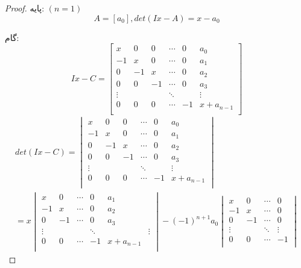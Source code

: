 \begin{proof}
  پایه: $\left(n=1\right)$
  $$ A = [a_0], det(Ix - A) = x - a_0 $$

  گام:
  \begin{equation}
    Ix - C =
    \begin{bmatrix}
      x & 0 & 0 & \cdots & 0 & a_0 \\
      -1 & x & 0 & \cdots & 0 & a_1 \\
      0 & -1 & x & \cdots & 0 & a_2 \\
      0 & 0 & -1 & \cdots & 0 & a_3 \\
      \vdots &  &  & \ddots & & \vdots \\
      0 & 0 & 0 & \cdots & -1 & x + a_{n-1} \\
    \end{bmatrix}
  \end{equation}
  \begin{equation}
    \begin{split}
      det(Ix - C) =
      \begin{vmatrix}
        x & 0 & 0 & \cdots & 0 & a_0 \\
        -1 & x & 0 & \cdots & 0 & a_1 \\
        0 & -1 & x & \cdots & 0 & a_2 \\
        0 & 0 & -1 & \cdots & 0 & a_3 \\
        \vdots &  &  & \ddots & & \vdots \\
        0 & 0 & 0 & \cdots & -1 & x + a_{n-1} \\
      \end{vmatrix}
      \\
      =
      x
      \begin{vmatrix}
        x & 0 & \cdots & 0 & a_1 \\
        -1 & x & \cdots & 0 & a_2 \\
        0 & -1 & \cdots & 0 & a_3 \\
        \vdots &  &  & \ddots & & \vdots \\
        0 & 0 & \cdots & -1 & x + a_{n-1} \\
      \end{vmatrix}
      -
      (-1)^{n+1}a_0
      \begin{vmatrix}
        x & 0 & \cdots & 0 \\
        -1 & x & \cdots & 0 \\
        0 & -1 & \cdots & 0 \\
        \vdots &  & \ddots & \vdots \\
        0 & 0 & \cdots & -1 \\
      \end{vmatrix}
    \end{split}


\end{equation}
\end{proof}
